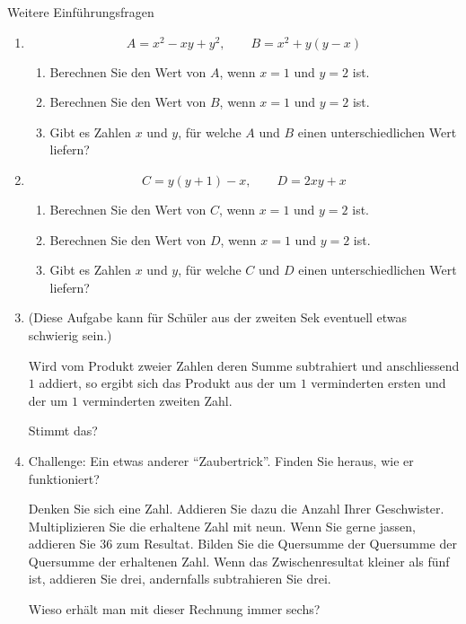 \clearpage
\begin{LA}
    {Weitere Einführungsfragen}{}
    \begin{enumerate}
        \item
              \[
                  A = x^2 - xy + y^2,
                  \qquad
                  B = x^2 + y(y-x)
              \]

              \begin{enumerate}
                  \item Berechnen Sie den Wert von \(A\), wenn \(x=1\) und \(y=2\) ist.
                  \item Berechnen Sie den Wert von \(B\), wenn \(x=1\) und \(y=2\) ist.
                  \item Gibt es Zahlen \(x\) und \(y\), für welche \(A\) und \(B\) einen unterschiedlichen Wert liefern?
              \end{enumerate}

        \item
              \[
                  C = y(y+1)-x,
                  \qquad
                  D = 2xy+x
              \]

              \begin{enumerate}
                  \item Berechnen Sie den Wert von \(C\), wenn \(x=1\) und \(y=2\) ist.
                  \item Berechnen Sie den Wert von \(D\), wenn \(x=1\) und \(y=2\) ist.
                  \item Gibt es Zahlen \(x\) und \(y\), für welche \(C\) und \(D\) einen unterschiedlichen Wert liefern?
              \end{enumerate}

        \item (Diese Aufgabe kann für Schüler aus der zweiten Sek eventuell etwas schwierig sein.)

              Wird vom Produkt zweier Zahlen deren Summe subtrahiert und anschliessend \(1\) addiert, so ergibt sich das Produkt aus der um \(1\) verminderten ersten und der um \(1\) verminderten zweiten Zahl.

              Stimmt das?

        \item Challenge: Ein etwas anderer \enquote{Zaubertrick}. Finden Sie heraus, wie er funktioniert?

              Denken Sie sich eine Zahl. Addieren Sie dazu die Anzahl Ihrer Geschwister. Multiplizieren Sie die erhaltene Zahl mit neun. Wenn Sie gerne jassen, addieren Sie \(36\) zum Resultat. Bilden Sie die Quersumme der Quersumme der Quersumme der erhaltenen Zahl. Wenn das Zwischenresultat kleiner als fünf ist, addieren Sie drei, andernfalls subtrahieren Sie drei.

              Wieso erhält man mit dieser Rechnung immer sechs?
    \end{enumerate}
\end{LA}

